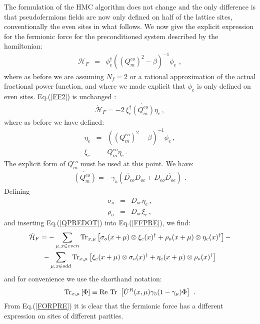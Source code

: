 \documentclass{article}[12pt]
\begin{document}
The formulation of the HMC algorithm does not change and the only difference is that pseudofermions fields 
are now only defined on half of the lattice sites, conventionally the even sites in what follows.
We now give the explicit expression for the fermionic force for the preconditioned system described by 
the hamiltonian:
\begin{eqnarray}
\mathcal{H}_F &=& \phi_e^\dagger ( (Q^{eo}_m)^2 - \beta )^{-1} \phi_e \,\, ,
\end{eqnarray}
where as before we are assuming $N_f=2$ or a rational approximation 
of the actual fractional power function, and where we made explicit that $\phi_e$ is 
only defined on even sites.
Eq.(\ref{FF2}) is unchanged :
\begin{eqnarray}
\dot{\mathcal{H}}_F = - 2 \ \xi_e^\dagger \dot{(Q^{eo}_m)} \eta_e \, ,\label{FFPRE}
\end{eqnarray}
where as before we have defined:
\begin{eqnarray}
\eta_e &=& ((Q^{eo}_m)^2 - \beta)^{-1} \phi_e \, , \\
\xi_e &=& Q^{eo}_m \eta_e \, .
\end{eqnarray}
The explicit form of $Q_m^{eo}$ must be used at this point. We have:
\begin{eqnarray}
\dot{(Q^{eo}_m)} = -\gamma_5 (\dot{D_{eo}} D_{oe} + D_{eo}\dot{D_{oe}} )\,\, .\label{QPREDOT}
\end{eqnarray}
Defining
\begin{eqnarray}
\sigma_o &=& D_{oe} \eta_e \, , \\
\rho_o &=& D_{oe} \xi_e \, ,
\end{eqnarray}
and inserting Eq.(\ref{QPREDOT}) into Eq.(\ref{FFPRE}), we find:
\begin{multline}
\dot{\mathcal{H}}_F =  - \sum_{\mu,x\in even} {\rm Tr}_{x,\mu}	\left[ \sigma_o(x+\mu)\otimes\xi_e(x)^\dagger + \rho_o(x+\mu)\otimes\eta_e(x)^\dagger \right] - \\
- \sum_{\mu,x\in odd} {\rm Tr}_{x,\mu}	\left[ \xi_e(x+\mu)\otimes\sigma_o(x)^\dagger + \eta_e(x+\mu)\otimes\rho_o(x)^\dagger \right] \label{FORPRE}
\end{multline}
and for convenience we use the shorthand notation:
\begin{equation}
{\rm Tr}_{x,\mu} \left[ \Phi \right] \equiv \mathrm{Re\ Tr\ } \left[ \dot U^R(x,\mu) \gamma_5 (1-\gamma_\mu) \Phi \right]\,\, .
\end{equation}
From Eq.(\ref{FORPRE}) it is clear that the fermionic force has a different expression on sites of different parities.
\end{document}
